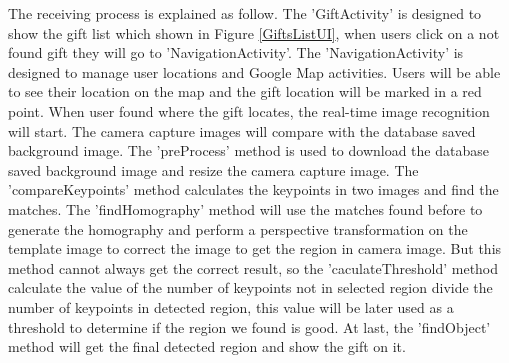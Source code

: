 \par The receiving process is explained as follow. The 'GiftActivity' is designed to show the gift list which shown in Figure \ref{GiftsListUI}, when users click on a not found gift they will go to 'NavigationActivity'. The 'NavigationActivity' is designed to manage user locations and Google Map activities. Users will be able to see their location on the map and the gift location will be marked in a red point. When user found where the gift locates, the real-time image recognition will start. The camera capture images will compare with the database saved background image. The 'preProcess' method is used to download the database saved background image and resize the camera capture image. The 'compareKeypoints' method calculates the keypoints in two images and find the matches. The 'findHomography' method will use the matches found before to generate the homography and perform a perspective transformation on the template image to correct the image to get the region in camera image. But this method cannot always get the correct result, so the 'caculateThreshold' method calculate the value of the number of keypoints not in selected region divide the number of keypoints in detected region, this value will be later used as a threshold to determine if the region we found is good. At last, the 'findObject' method will get the final detected region and show the gift on it.


